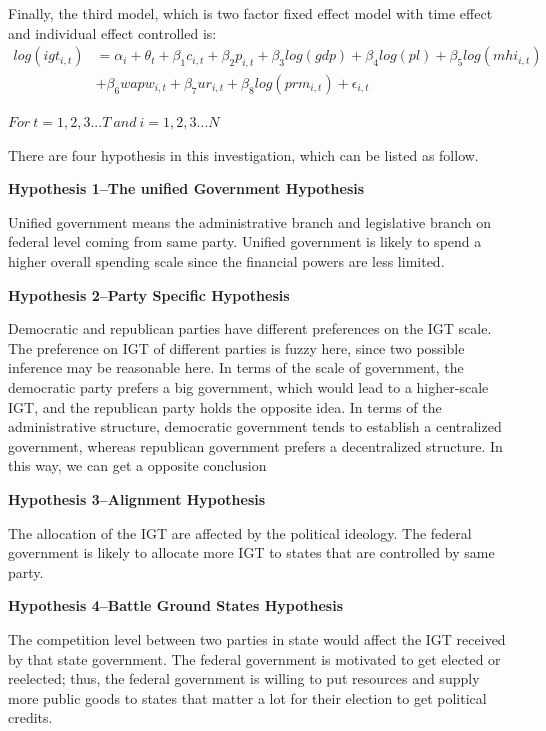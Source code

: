 Finally, the third model, which is two factor fixed effect model with time effect and individual effect controlled is:
\begin{equation}
    \begin{split}
        log(igt_{i,t}) & = \alpha_i + \theta_t + \beta_1 c_{i,t} + \beta_2 p_{i,t} + \beta_3 log(gdp) + \beta_4 log(pl) + \beta_5 log(mhi_{i,t}) \\
        &+ \beta_6 wapw_{i,t} + \beta_7 ur_{i,t} +\beta_8 log(prm_{i,t}) + \epsilon_{i,t}
    \end{split}
\end{equation}

$For\ t = 1, 2, 3...T\ and\ i = 1, 2, 3...N $

There are four hypothesis in this investigation, which can be listed as follow.

\textbf{Hypothesis 1–The unified Government Hypothesis}

Unified government means the administrative branch and legislative branch on federal level coming from same party. Unified government is likely to spend a higher overall spending scale since the financial powers are less limited.

\textbf{Hypothesis 2–Party Specific Hypothesis}

Democratic and republican parties have different preferences on the IGT scale. The preference on IGT of different parties is fuzzy here, since two possible inference may be reasonable here. In terms of the scale of government, the democratic party prefers a big government, which would lead to a higher-scale IGT, and the republican party holds the opposite idea. In terms of the administrative structure, democratic government tends to establish a centralized government, whereas republican government prefers a decentralized structure. In this way, we can get a opposite conclusion

\textbf{Hypothesis 3–Alignment Hypothesis}

The allocation of the IGT are affected by the political ideology. The federal government is likely to allocate more IGT to states that are controlled by same party.

\textbf{Hypothesis 4–Battle Ground States Hypothesis}

The competition level between two parties in state would affect the IGT received by that state government. The federal government is motivated to get elected or reelected; thus, the federal government is willing to put resources and supply more public goods to states that matter a lot for their election to get political credits.

